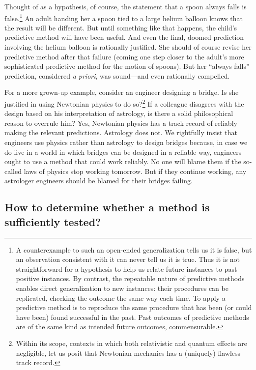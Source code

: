 \documentclass[
  letterpaper,
  DIV=11,
  numbers=noendperiod]{scrartcl}
\theoremstyle{definition}
\theoremstyle{remark}
\begin{document}
Thought of as a hypothesis, of course, the statement that a spoon always
falls is false.\footnote{A counterexample to such an open-ended
  generalization tells us it is false, but an observation consistent
  with it can never tell us it is true. Thus it is not straightforward
  for a hypothesis to help us relate future instances to past positive
  instances. By contrast, the repeatable nature of predictive methods
  enables direct generalization to new instances: their procedures can
  be replicated, checking the outcome the same way each time. To apply a
  predictive method is to reproduce the same procedure that has been (or
  could have been) found successful in the past. Past outcomes of
  predictive methods are of the same kind as intended future outcomes,
  commensurable.} An adult handing her a spoon tied to a large helium
balloon knows that the result will be different. But until something
like that happens, the child's predictive method will have been useful.
And even the final, doomed prediction involving the helium balloon is
rationally justified. She should of course revise her predictive method
after that failure (coming one step closer to the adult's more
sophisticated predictive method for the motion of spoons). But her
``always falls'' prediction, considered \emph{a priori}, was sound---and
even rationally compelled.

For a more grown-up example, consider an engineer designing a bridge. Is
she justified in using Newtonian physics to do so?\footnote{Within its
  scope, contexts in which both relativistic and quantum effects are
  negligible, let us posit that Newtonian mechanics has a (uniquely)
  flawless track record.} If a colleague disagrees with the design based
on his interpretation of astrology, is there a solid philosophical
reason to overrule him? Yes, Newtonian physics has a track record of
reliably making the relevant predictions. Astrology does not. We
rightfully insist that engineers use physics rather than astrology to
design bridges because, in case we do live in a world in which bridges
can be designed in a reliable way, engineers ought to use a method that
could work reliably. No one will blame them if the so-called laws of
physics stop working tomorrow. But if they continue working, any
astrologer engineers should be blamed for their bridges failing.

\subsection{How to determine whether a method is sufficiently
tested?}\label{sec-multi}
\end{document}
